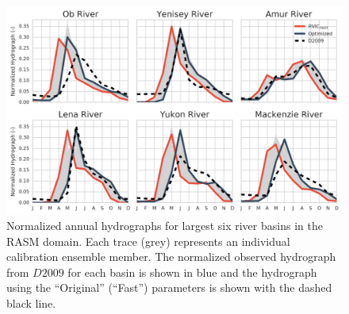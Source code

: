 \documentclass[jgrga, draft]{agutex}
\begin{document}
\clearpage
\begin{figure}
\noindent\includegraphics[width=40pc,natwidth=1]{calibration_hydrographs}
\caption{Normalized annual hydrographs for largest six river basins in the RASM domain.
Each trace (grey) represents an individual calibration ensemble member.
The normalized observed hydrograph from $D2009$ for each basin is shown in blue and the hydrograph using the ``Original'' (``Fast'') parameters is shown with the dashed black line.}
\label{fig:calibration_hydrographs}
\end{figure}
\end{document}
